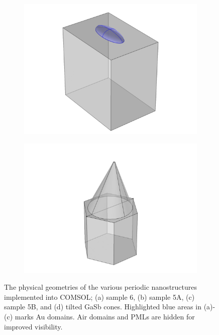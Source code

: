 \begin{figure}[htb!]
\begin{subfigure}{0.24\textwidth}
        \centering
        \includegraphics[width=\linewidth, trim=2cm 0cm 2cm 0cm, clip]{figures/ch4/implem/geometry/Sample5B_markedAu.png}
        \caption{}
    \end{subfigure}
    \begin{subfigure}{0.24\textwidth}
        \centering
        \includegraphics[width=\linewidth, trim=2cm 0cm 2cm 0cm, clip]{figures/ch4/implem/geometry/GaSb.png}
        \caption{}
    \end{subfigure}
    \caption{The physical geometries of the various periodic nanostructures implemented into COMSOL; (a) sample 6, (b) sample 5A, (c) sample 5B, and (d) tilted GaSb cones. Highlighted blue areas in (a)-(c) marks Au domains. Air domains and PMLs are hidden for improved visibility.}
    \label{fig:implementation_geometry_samples}
\end{figure}

